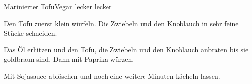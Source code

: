 
\begin{recipe}[]{Marinierter Tofu}{Vegan lecker lecker}{}



\step
Den Tofu zuerst klein w\"urfeln. Die Zwiebeln und den Knoblauch in sehr feine St\"ucke schneiden.

\step
Das \"Ol erhitzen und den Tofu, die Zwiebeln und den Knoblauch anbraten bis sie goldbraun sind. Dann mit Paprika w\"urzen.

\step
Mit Sojasauce abl\"oschen und noch eine weitere Minuten k\"ocheln lassen.


\end{recipe}